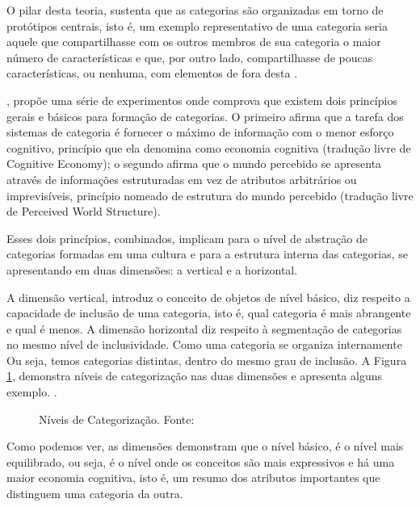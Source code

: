 O pilar desta teoria, sustenta que as categorias são organizadas em torno de protótipos centrais, isto é, um exemplo representativo de uma categoria seria aquele que compartilhasse com os outros membros de sua categoria o maior número de características e que, por outro lado, compartilhasse de poucas características, ou nenhuma, com elementos de fora desta \cite{lima:2007.categorizacao}.

, propõe uma série de experimentos onde comprova que existem dois princípios gerais e básicos para formação de categorias. O primeiro afirma que a tarefa dos sistemas de categoria é fornecer o máximo de informação com o menor esforço cognitivo, princípio que ela denomina como economia cognitiva (tradução livre de Cognitive Economy); o segundo afirma que o mundo percebido se apresenta através de informações estruturadas em vez de atributos arbitrários ou imprevisíveis, princípio nomeado de estrutura do mundo percebido (tradução livre de Perceived World Structure).

Esses dois princípios, combinados, implicam para o nível de abstração de categorias formadas em uma cultura e para a estrutura interna das categorias, se apresentando em duas dimensões: a vertical e a horizontal\cite{rosch:1999.principles}.

A dimensão vertical, introduz o conceito de objetos de nível básico, diz respeito a capacidade de inclusão de uma categoria, isto é, qual categoria é mais abrangente e qual é menos. A dimensão horizontal diz respeito à segmentação de categorias no mesmo nível de inclusividade. Como uma categoria se organiza internamente Ou seja, temos categorias distintas, dentro do mesmo grau de inclusão. A Figura \ref{fig:niveis_categoraizacao}, demonstra níveis de categorização nas duas dimensões e apresenta alguns exemplo. \cite{lacerda:2012.linguagem}.

\begin{figure}[!ht]
    \centering
    \caption{Níveis de Categorização. Fonte: }
    \label{fig:niveis_categoraizacao}
\end{figure}

Como podemos ver, as dimensões demonstram que o nível básico, é o nível mais equilibrado, ou seja, é o nível onde os conceitos são mais expressivos e há uma maior economia cognitiva, isto é, um resumo dos atributos importantes que distinguem uma categoria da outra.

